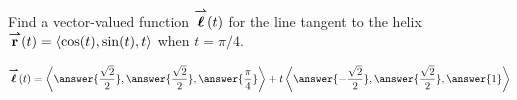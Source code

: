 \documentclass{ximera}
\author{David Guichard \and Neal Koblitz \and H. Jerome Keisler \and Albert Scheller \and Barry Balof \and Mike Wills \and Matthew Carr}
\begin{document}
\begin{exercise}

Find a vector-valued function ${\overset{\boldsymbol{\rightharpoonup}}{\mathbf{\boldsymbol{\ell}}}}(t)$ for the line tangent to the helix ${\overset{\boldsymbol{\rightharpoonup}}{\mathbf{r}}}(t)=\left\langle \cos(t),\sin(t),t\right\rangle$ when $t=\pi/4$.

\begin{prompt}
\[
\vecl(t)=\vector{\answer{\frac{\sqrt{2}}{2}},\answer{\frac{\sqrt{2}}{2}},\answer{\frac{\pi}{4}}}+t\vector{\answer{-\frac{\sqrt{2}}{2}},\answer{\frac{\sqrt{2}}{2}},\answer{1}}
\]
\end{prompt}


\end{exercise}
\end{document}
